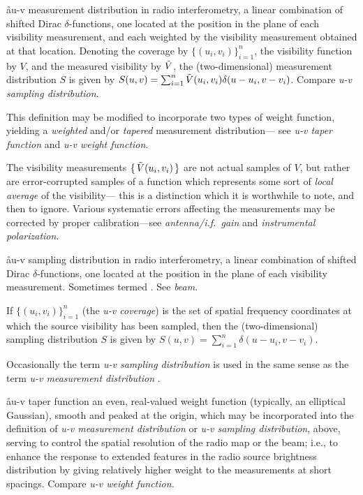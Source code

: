 \aa{u-v measurement distribution}
in radio interferometry,
a linear combination of shifted Dirac $\delta$-functions,
one located at the position in the \uv plane of each
visibility measurement,
and each weighted by the visibility measurement obtained
at that location.
Denoting the \uv coverage by $\{(u_i,v_i)\}_{i=1}^n$,
the visibility function by $V$,
and the measured visibility by $\tilde V$,
the (two-dimensional) \uv measurement distribution $S$
is given by
$S(u,v)=\sum_{i=1}^n \tilde V(u_i,v_i)\delta(u-u_i,v-v_i)$.
Compare {\it u-v sampling distribution}.
\par
This definition may be modified to incorporate two
types of weight function, yielding a {\it weighted}
and\slash or {\it tapered} measurement distribution---%
see {\it u-v taper function} and {\it u-v weight function}\/.
\par
The visibility measurements $\{\,\tilde V(u_i,v_i)\,\}$
are not actual samples of $V$,
but rather are error-corrupted samples of a function
which represents some sort of {\sl local average} of the visibility---%
this is a distinction which it is worthwhile to note, and then to ignore.
Various systematic errors affecting the measurements may be
corrected by proper calibration---see {\it antenna/i.f.\ gain}
and {\it instrumental polarization}.

\aa{u-v sampling distribution}
in radio interferometry, a linear combination of shifted Dirac
$\delta$-functions,
one located at the position in the \uv plane of each
visibility measurement.
Sometimes termed .
See {\it beam}.
\par
If $\{(u_i,v_i)\}_{i=1}^n$ (the {\it u-v coverage})
is the set of spatial frequency coordinates at which
the source visibility has been sampled,
then the (two-dimensional) \uv sampling distribution $S$
is given by
$S(u,v)=\sum_{i=1}^n\delta(u-u_i,v-v_i)$.
\par
Occasionally the term {\it u-v sampling distribution} is
used in the same sense as the term
{\it u-v measurement distribution} \qv.

\aa{u-v taper function}
an even, real-valued weight function
(typically, an elliptical Gaussian), smooth and peaked at the origin,
which may be
incorporated into the definition of {\it u-v measurement
distribution} or {\it u-v sampling distribution}\/, above,
serving to control the spatial
resolution of the radio map or the beam; i.e., to enhance the response
to extended features in the radio source brightness distribution
by giving relatively higher weight to the measurements
at short \uv spacings.
Compare {\it u-v weight function.}

